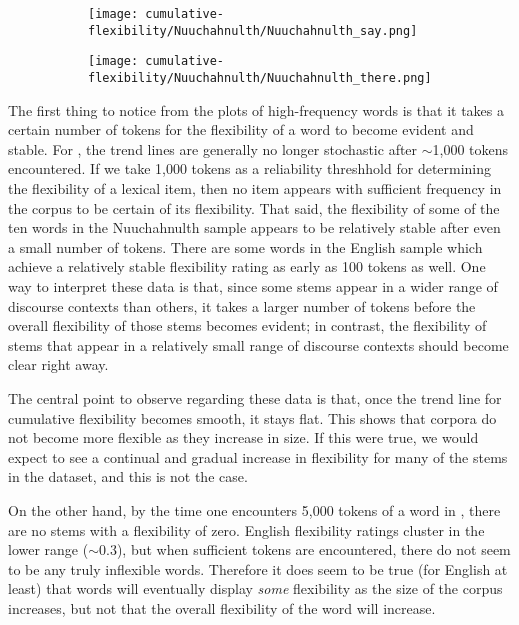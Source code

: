 \begin{figure}
  \begin{subfigure}{0.5\linewidth}
    \centering
    \caption{ }
    \texttt{[image: cumulative-flexibility/Nuuchahnulth/Nuuchahnulth\_say.png]}
  \end{subfigure}%
  \begin{subfigure}{0.5\linewidth}
    \centering
    \caption{ }
    \texttt{[image: cumulative-flexibility/Nuuchahnulth/Nuuchahnulth\_there.png]}
  \end{subfigure}

\end{figure}

The first thing to notice from the plots of high-frequency words is that it takes a certain number of tokens for the flexibility of a word to become evident and stable. For , the trend lines are generally no longer stochastic after $\sim$1,000 tokens encountered. If we take 1,000 tokens as a reliability threshhold for determining the flexibility of a lexical item, then no  item appears with sufficient frequency in the corpus to be certain of its flexibility. That said, the flexibility of some of the ten words in the Nuuchahnulth sample appears to be relatively stable after even a small number of tokens. There are some words in the English sample which achieve a relatively stable flexibility rating as early as 100 tokens as well. One way to interpret these data is that, since some stems appear in a wider range of discourse contexts than others, it takes a larger number of tokens before the overall flexibility of those stems becomes evident; in contrast, the flexibility of stems that appear in a relatively small range of discourse contexts should become clear right away.

The central point to observe regarding these data is that, once the trend line for cumulative flexibility becomes smooth, it stays flat. This shows that corpora do not become more flexible as they increase in size. If this were true, we would expect to see a continual and gradual increase in flexibility for many of the stems in the dataset, and this is not the case.

On the other hand, by the time one encounters 5,000 tokens of a word in , there are no stems with a flexibility of zero. English flexibility ratings cluster in the lower range ($\sim0.3$), but when sufficient tokens are encountered, there do not seem to be any truly inflexible words. Therefore it does seem to be true (for English at least) that words will eventually display \emph{some} flexibility as the size of the corpus increases, but not that the overall flexibility of the word will increase.

